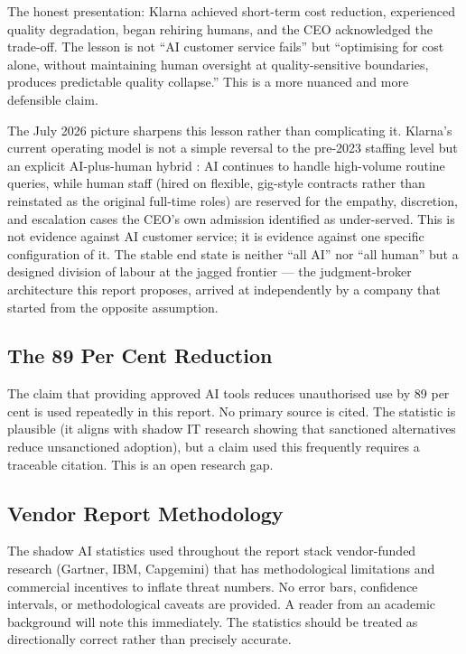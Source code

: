 The honest presentation: Klarna achieved short-term cost reduction, experienced quality degradation, began rehiring humans, and the CEO acknowledged the trade-off. The lesson is not ``AI customer service fails'' but ``optimising for cost alone, without maintaining human oversight at quality-sensitive boundaries, produces predictable quality collapse.'' This is a more nuanced and more defensible claim.

The July 2026 picture sharpens this lesson rather than complicating it. Klarna's current operating model is not a simple reversal to the pre-2023 staffing level but an explicit AI-plus-human hybrid \parencite{KlarnaHybrid2026}: AI continues to handle high-volume routine queries, while human staff (hired on flexible, gig-style contracts rather than reinstated as the original full-time roles) are reserved for the empathy, discretion, and escalation cases the CEO's own admission identified as under-served. This is not evidence against AI customer service; it is evidence against one specific configuration of it. The stable end state is neither ``all AI'' nor ``all human'' but a designed division of labour at the jagged frontier --- the judgment-broker architecture this report proposes, arrived at independently by a company that started from the opposite assumption.

\subsection{The 89 Per Cent Reduction}

The claim that providing approved AI tools reduces unauthorised use by 89 per cent is used repeatedly in this report. No primary source is cited. The statistic is plausible (it aligns with shadow IT research showing that sanctioned alternatives reduce unsanctioned adoption), but a claim used this frequently requires a traceable citation. This is an open research gap.

\subsection{Vendor Report Methodology}

The shadow AI statistics used throughout the report stack vendor-funded research (Gartner, IBM, Capgemini) that has methodological limitations and commercial incentives to inflate threat numbers. No error bars, confidence intervals, or methodological caveats are provided. A reader from an academic background will note this immediately. The statistics should be treated as directionally correct rather than precisely accurate.

